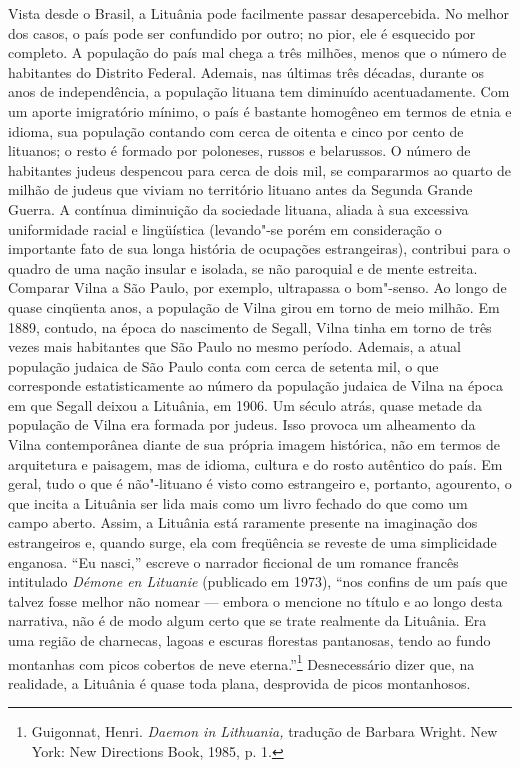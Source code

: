 Vista desde o Brasil, a Lituânia pode facilmente passar desapercebida.
No melhor dos casos, o país pode ser confundido por outro; no pior, ele
é esquecido por completo. A população do país mal chega a três milhões,
menos que o número de habitantes do Distrito Federal. Ademais, nas
últimas três décadas, durante os anos de independência, a população
lituana tem diminuído acentuadamente. Com um aporte imigratório mínimo,
o país é bastante homogêneo em termos de etnia e idioma, sua população
contando com cerca de oitenta e cinco por cento de lituanos; o resto é
formado por poloneses, russos e belarussos. O número de habitantes
judeus despencou para cerca de dois mil, se compararmos ao quarto de
milhão de judeus que viviam no território lituano antes da Segunda
Grande Guerra. A contínua diminuição da sociedade lituana, aliada à sua
excessiva uniformidade racial e lingüística (levando"-se porém em
consideração o importante fato de sua longa história de ocupações
estrangeiras), contribui para o quadro de uma nação insular e isolada,
se não paroquial e de mente estreita. Comparar Vilna a São Paulo, por
exemplo, ultrapassa o bom"-senso. Ao longo de quase cinqüenta anos, a
população de Vilna girou em torno de meio milhão. Em 1889, contudo, na
época do nascimento de Segall, Vilna tinha em torno de três vezes mais
habitantes que São Paulo no mesmo período. Ademais, a atual população
judaica de São Paulo conta com cerca de setenta mil, o que corresponde
estatisticamente ao número da população judaica de Vilna na época em que
Segall deixou a Lituânia, em 1906. Um século atrás, quase metade da
população de Vilna era formada por judeus. Isso provoca um alheamento da
Vilna contemporânea diante de sua própria imagem histórica, não em
termos de arquitetura e paisagem, mas de idioma, cultura e do rosto
autêntico do país. Em geral, tudo o que é não"-lituano é visto como
estrangeiro e, portanto, agourento, o que incita a Lituânia ser lida
mais como um livro fechado do que como um campo aberto. Assim, a
Lituânia está raramente presente na imaginação dos estrangeiros e,
quando surge, ela com freqüência se reveste de uma simplicidade
enganosa. ``Eu nasci,'' escreve o narrador ficcional de um romance
francês intitulado \emph{Démone en Lituanie} (publicado em 1973), ``nos
confins de um país que talvez fosse melhor não nomear --- embora o
mencione no título e ao longo desta narrativa, não é de modo algum certo
que se trate realmente da Lituânia. Era uma região de charnecas, lagoas
e escuras florestas pantanosas, tendo ao fundo montanhas com picos
cobertos de neve eterna.''\footnote{Guigonnat, Henri. \emph{Daemon in
  Lithuania,} tradução de Barbara Wright. New York: New Directions Book,
  1985, p. 1.} Desnecessário dizer que, na realidade, a Lituânia é quase
toda plana, desprovida de picos montanhosos.

